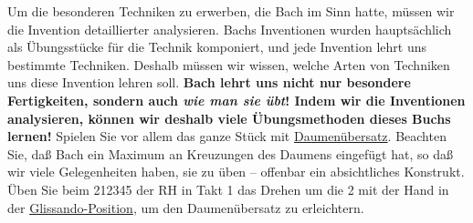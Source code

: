 Um die besonderen Techniken zu erwerben, die Bach im Sinn hatte, müssen wir die Invention detaillierter analysieren.
Bachs Inventionen wurden hauptsächlich als Übungsstücke für die Technik komponiert, und jede Invention lehrt uns bestimmte Techniken.
Deshalb müssen wir wissen, welche Arten von Techniken uns diese Invention lehren soll.
\textbf{Bach lehrt uns nicht nur besondere Fertigkeiten, sondern auch \textit{wie man sie übt}! Indem wir die Inventionen analysieren, können wir deshalb viele Übungsmethoden dieses Buchs lernen!}
Spielen Sie vor allem das ganze Stück mit \hyperref[c1iii5b]{Daumenübersatz}.
Beachten Sie, daß Bach ein Maximum an Kreuzungen des Daumens eingefügt hat, so daß wir viele Gelegenheiten haben, sie zu üben -- offenbar ein absichtliches Konstrukt.
Üben Sie beim 212345 der RH in Takt 1 das Drehen um die 2 mit der Hand in der \hyperref[c1iii5c]{Glissando-Position}, um den Daumenübersatz zu erleichtern.


